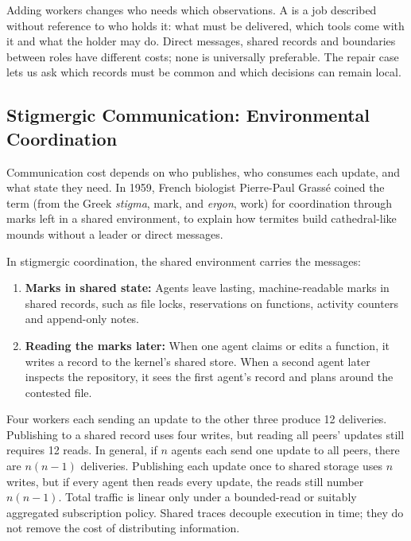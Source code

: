 Adding workers changes who needs which observations. A  is a job described without reference to who holds it: what must be delivered, which tools come with it and what the holder may do. Direct messages, shared records and boundaries between roles have different costs; none is universally preferable. The repair case lets us ask which records must be common and which decisions can remain local.

\subsection{Stigmergic Communication: Environmental Coordination}

Communication cost depends on who publishes, who consumes each update, and what state they need. In 1959, French biologist Pierre-Paul Grass{\'e} coined the term  (from the Greek \emph{stigma}, mark, and \emph{ergon}, work) for coordination through marks left in a shared environment, to explain how termites build cathedral-like mounds without a leader or direct messages.

%
In stigmergic coordination, the shared environment carries the messages:
\begin{enumerate}[leftmargin=1.8em,itemsep=2pt]
  \item \textbf{Marks in shared state:} Agents leave lasting, machine-readable marks in shared records, such as file locks, reservations on functions, activity counters and append-only notes.
  \item \textbf{Reading the marks later:} When one agent claims or edits a function, it writes a record to the kernel's shared store. When a second agent later inspects the repository, it sees the first agent's record and plans around the contested file.
\end{enumerate}

Four workers each sending an update to the other three produce 12 deliveries. Publishing to a shared record uses four writes, but reading all peers' updates still requires 12 reads. In general, if $n$ agents each send one update to all peers, there are $n(n-1)$ deliveries. Publishing each update once to shared storage uses $n$ writes, but if every agent then reads every update, the reads still number $n(n-1)$. Total traffic is linear only under a bounded-read or suitably aggregated subscription policy. Shared traces decouple execution in time; they do not remove the cost of distributing information.

